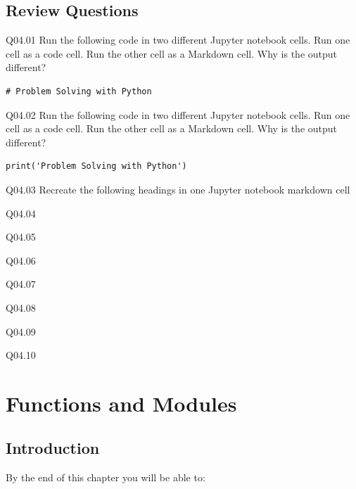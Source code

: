 \documentclass{book}
\newenvironment{problems}{}{}  %
\begin{document}
    
        \section{Review Questions}\label{review-questions}
    




    
        \begin{problems}
        Q04.01 Run the following code in two different Jupyter notebook cells.
Run one cell as a code cell. Run the other cell as a Markdown cell. Why
is the output different?

\begin{lstlisting}
# Problem Solving with Python
\end{lstlisting}

Q04.02 Run the following code in two different Jupyter notebook cells.
Run one cell as a code cell. Run the other cell as a Markdown cell. Why
is the output different?

\begin{lstlisting}
print('Problem Solving with Python')
\end{lstlisting}

Q04.03 Recreate the following headings in one Jupyter notebook markdown
cell

Q04.04

Q04.05

Q04.06

Q04.07

Q04.08

Q04.09

Q04.10
        \end{problems}

    




    
        \chapter{Functions and Modules}\label{functions-and-modules}
    




    
        \section{Introduction}\label{introduction}
    




    
        By the end of this chapter you will be able to:
\end{document}
